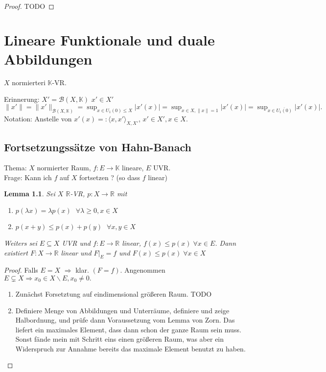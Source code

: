 \documentclass[ngerman]{report}
\theoremstyle{plain}%
\newtheorem{lemma}[thm]{Lemma}
\theoremstyle{definition}%
\theoremstyle{myStyle}
\newcommand{\R}{\mathbb{R}}
\newcommand{\K}{\mathbb{K}}
\newcommand{\B}{\mathcal{B}} %
\newcommand{\norm}[1]{\|#1\|}
\newcommand{\df}[1][]{%
	\overset{#1}{\Rightarrow}
}
\newcommand{\U}[2][1]{U_{#1}(#2)} %
\newcommand{\EK}{\U{0}} %
\begin{document}
	\begin{proof}
		TODO
	\end{proof}

	\newcommand{\BKK}{\B(X,\K)}
	\chapter{Lineare Funktionale und duale Abbildungen}
	$X$ normierteri $\K$-VR.\par
	Erinnerung: $X' = \B(X,\K)$ $x' \in X'$ $\norm{x'} = \norm{x'}_{\B(X,\K)} = \sup_{x\in \EK \leq X}|x'(x)| = \sup_{x\in X, \norm{x} = 1} |x'(x)| = \sup_{x\in \overline{\EK}}|x'(x)|.$
	Notation: Anstelle von $x'(x) =: \langle x,x' \rangle _{X,X'}$, $x' \in X', x\in X$.

	\section{Fortsetzungssätze von Hahn-Banach}
	Thema: $X$ normierter Raum, $f: E \to \K$ lineare, $E$ UVR. \\
	Frage: Kann ich $f$ auf $X$ fortsetzen ? (so dass $f$ linear)

	\begin{lemma}
		Sei $X$ $\R$-VR, $p : X \to \R$ mit 
			\begin{enumerate}[1)]
							\item $p(\lambda x) = \lambda p(x)$ $\; \forall \lambda \geq 0, x\in X$
							\item $p(x + y) \leq p(x) + p(y)$ $\; \forall x,y \in X$
			\end{enumerate}
 Weiters sei $E \subseteq X$ UVR und $f: E \to \R$ linear, $f(x) \leq p(x) \; \forall x \in E$. 
 Dann existiert $F: X\to \R$ linear und $F|_{E} = f$ und $F(x) \leq p(x) \; \forall x \in X$
	\end{lemma}

	\begin{proof}
		Falls $E = X$ $\df$ klar. $(F = f)$.	Angenommen $E \subsetneq X \df x_0 \in X\backslash E, x_0 \neq 0.$

		\begin{enumerate}[1 {Schritt:}]
			\item Zunächst Forsetztung auf eindimensional größeren Raum. TODO 
			\item Definiere Menge von Abbildungen und Unterräume, definiere und zeige Halbordnung, und prüfe dann Voraussetzung vom Lemma von Zorn. Das liefert ein maximales Element, dass dann schon der ganze Raum sein muss. Sonst fände mein mit Schritt eins einen größeren Raum, was aber ein Widerspruch zur Annahme bereits das maximale Element benutzt zu haben. 	
		\end{enumerate}
	\end{proof}
\end{document}
